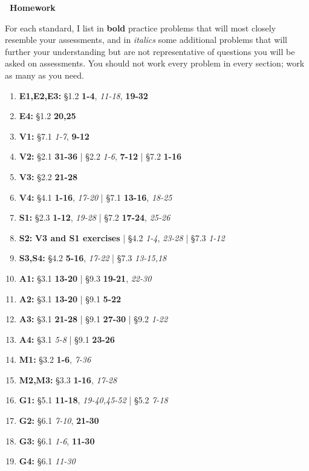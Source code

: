 \documentclass{article}
\begin{document}
\begin{center}
{\Large \bf \course\  Homework} \\
\sem
\end{center}

\newcommand{\closeExamples}{\textbf}
\newcommand{\otherExamples}{\textit}
\newcommand{\standards}[1]{\item[\textbf{#1}]}

For each standard, I list in \closeExamples{bold} practice problems that will most closely resemble your assessments, and in \otherExamples{italics} some additional problems that will further your understanding but are not representative of questions you will be asked on assessments.  You should not work every problem in every section; work as many as you need.

\begin{enumerate}
  \standards{E1,E2,E3:} \S 1.2
    \closeExamples{1-4},
    \otherExamples{11-18},
    \closeExamples{19-32}

  \standards{E4:} \S 1.2
    \closeExamples{20,25}

  \standards{V1:} \S 7.1
    \otherExamples{1-7},
    \closeExamples{9-12}

  \standards{V2:} \S 2.1
    \closeExamples{31-36}
    | \S 2.2
    \otherExamples{1-6},
    \closeExamples{7-12}
    | \S 7.2
    \closeExamples{1-16}

  \standards{V3:} \S 2.2
    \closeExamples{21-28}

  \standards{V4:} \S 4.1
    \closeExamples{1-16},
    \otherExamples{17-20}
    | \S 7.1
    \closeExamples{13-16},
    \otherExamples{18-25}

  \standards{S1:} \S 2.3
    \closeExamples{1-12},
    \otherExamples{19-28}
    | \S 7.2
    \closeExamples{17-24},
    \otherExamples{25-26}

  \standards{S2:}
    \closeExamples{\textbf{V3} and \textbf{S1} exercises}
    | \S 4.2
    \otherExamples{1-4},
    \otherExamples{23-28}
    | \S 7.3
    \otherExamples{1-12}

  \standards{S3,S4:} \S 4.2
    \closeExamples{5-16},
    \otherExamples{17-22}
    | \S 7.3
    \otherExamples{13-15,18}

  \standards{A1:} \S 3.1 \closeExamples{13-20} | \S 9.3 \closeExamples{19-21}, \otherExamples{22-30}
  \standards{A2:} \S 3.1 \closeExamples{13-20} | \S 9.1 \closeExamples{5-22}
  \standards{A3:} \S 3.1 \closeExamples{21-28} | \S 9.1 \closeExamples{27-30} | \S 9.2 \otherExamples{1-22}
  \standards{A4:} \S 3.1 \otherExamples{5-8} | \S 9.1 \closeExamples{23-26}
  \standards{M1:} \S 3.2 \closeExamples{1-6}, \otherExamples{7-36}
  \standards{M2,M3:} \S 3.3 \closeExamples{1-16}, \otherExamples{17-28}
  \standards{G1:} \S 5.1 \closeExamples{11-18}, \otherExamples{19-40,45-52} | \S 5.2 \otherExamples{7-18}
  \standards{G2:} \S 6.1 \otherExamples{7-10}, \closeExamples{21-30}
  \standards{G3:} \S 6.1 \otherExamples{1-6}, \closeExamples{11-30}
  \standards{G4:} \S 6.1 \otherExamples{11-30}
\end{enumerate}
\end{document}
